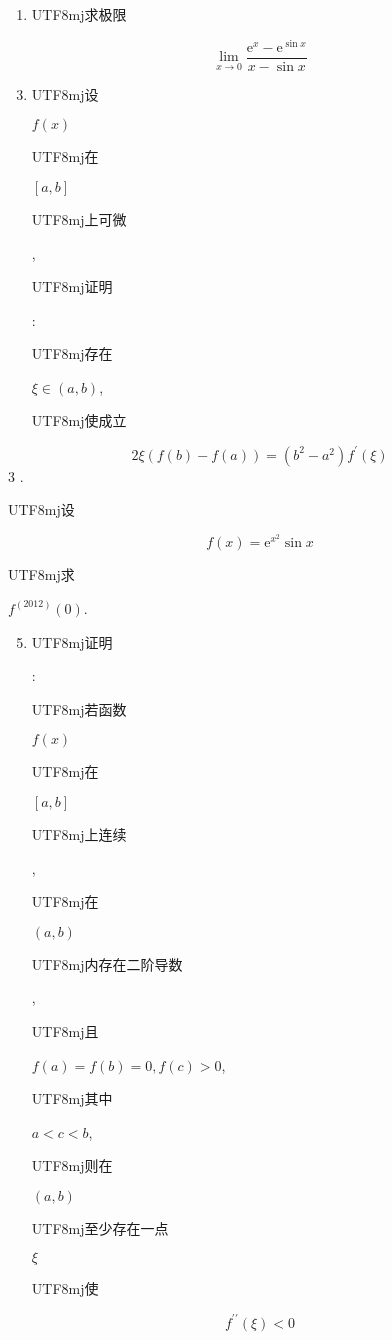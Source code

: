 \documentclass[10pt]{article}
\begin{document}
\begin{enumerate}
  \item \begin{CJK}{UTF8}{mj}求极限\end{CJK}
\end{enumerate}
$$
\lim _{x \rightarrow 0} \frac{\mathrm{e}^{x}-\mathrm{e}^{\sin x}}{x-\sin x}
$$

\begin{enumerate}
  \setcounter{enumi}{2}
  \item \begin{CJK}{UTF8}{mj}设\end{CJK} $f(x)$ \begin{CJK}{UTF8}{mj}在\end{CJK} $[a, b]$ \begin{CJK}{UTF8}{mj}上可微\end{CJK}, \begin{CJK}{UTF8}{mj}证明\end{CJK}: \begin{CJK}{UTF8}{mj}存在\end{CJK} $\xi \in(a, b)$, \begin{CJK}{UTF8}{mj}使成立\end{CJK}
\end{enumerate}
$$
2 \xi(f(b)-f(a))=\left(b^{2}-a^{2}\right) f^{\prime}(\xi)
$$
3 . \begin{CJK}{UTF8}{mj}设\end{CJK}
$$
f(x)=\mathrm{e}^{x^{2}} \sin x
$$
\begin{CJK}{UTF8}{mj}求\end{CJK} $f^{(2012)}(0)$.

\begin{enumerate}
  \setcounter{enumi}{4}
  \item \begin{CJK}{UTF8}{mj}证明\end{CJK}: \begin{CJK}{UTF8}{mj}若函数\end{CJK} $f(x)$ \begin{CJK}{UTF8}{mj}在\end{CJK} $[a, b]$ \begin{CJK}{UTF8}{mj}上连续\end{CJK}, \begin{CJK}{UTF8}{mj}在\end{CJK} $(a, b)$ \begin{CJK}{UTF8}{mj}内存在二阶导数\end{CJK}, \begin{CJK}{UTF8}{mj}且\end{CJK} $f(a)=f(b)=0, f(c)>0$, \begin{CJK}{UTF8}{mj}其中\end{CJK} $a<c<b$, \begin{CJK}{UTF8}{mj}则在\end{CJK} $(a, b)$ \begin{CJK}{UTF8}{mj}至少存在一点\end{CJK} $\xi$ \begin{CJK}{UTF8}{mj}使\end{CJK}
\end{enumerate}
$$
f^{\prime \prime}(\xi)<0
$$
\end{document}
